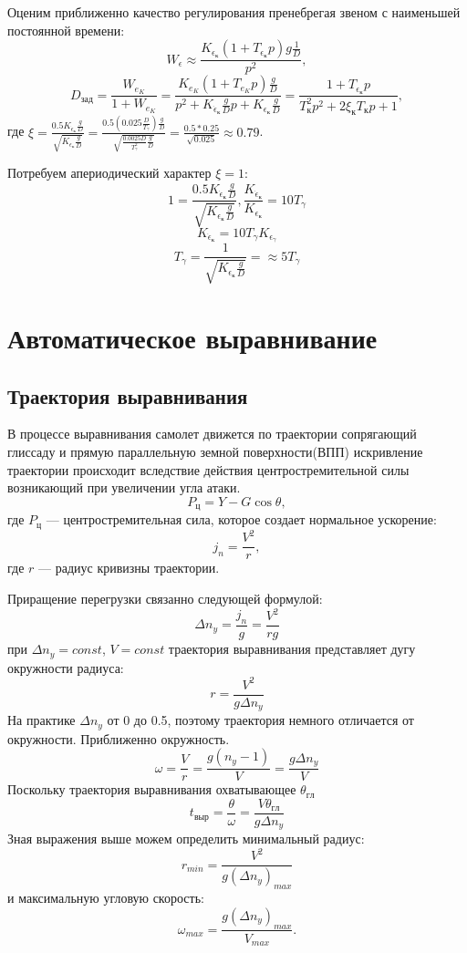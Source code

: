 \documentclass{article}
\begin{document}
Оценим приближенно качество регулирования пренебрегая звеном с наименьшей
постоянной времени:
\[
	W_{\epsilon} \approx \frac{K_{\epsilon_\text{к}}(1 + T_{\epsilon_\text{к}}
		p)g \frac{1}{D}}{p^2},
\]
\[
	D_\text{зад} = \frac{W_{e_K}}{1 + W_{e_K}} = \frac{K_{e_K} (1 + T_{e_K} p)
	\frac{g}{D}}{ p^2 + K_{\dot{\epsilon}_{\text{к}}} \frac{g}{D}p +
	K_{\epsilon_\text{к}} \frac{g}{D}} = \frac{1 + T_{\epsilon_\text{к}}p
	}{T_\text{к}^2 p^2 + 2 \xi_\text{к} T_\text{к} p + 1},
\]
где $\xi = \frac{0.5 K_{\dot{\epsilon}_{\text{к}}}
	\frac{g}{D}}{\sqrt{K_{\epsilon_\text{к}} \frac{g}{D}}} =\frac{0.5(0.025
		\frac{D}{T_\gamma}) \frac{g}{D}}{\sqrt{\frac{0.0025 D}{T^2_\gamma}
			\frac{g}{D}}} = \frac{0.5 * 0.25}{\sqrt{0.025}} \approx 0.79$.

Потребуем апериодический характер $\xi = 1$:
\[
	1 = \frac{0.5 K_{\dot{\epsilon}_{\text{к}}}
	\frac{g}{D}}{\sqrt{K_{{\epsilon}_{\text{к}}} \frac{g}{D}}},
	\frac{K_{\dot{\epsilon}_{\text{к}}}}{K_{{\epsilon}_{\text{к}}}} = 10
	T_\gamma
\]
\[
	K_{\dot{\epsilon}_{\text{к}}} = 10 T_{\gamma}  K_{\epsilon_\gamma}
\]
\[
	T_\gamma  = \frac{1}{\sqrt{K_{\epsilon_\text{к}}\frac{g}{D}}} = \approx 5
	T_\gamma
\]

\section{Автоматическое выравнивание}
\subsection{Траектория выравнивания }

В процессе выравнивания самолет движется по траектории сопрягающий глиссаду и
прямую параллельную земной поверхности(ВПП) искривление траектории происходит
вследствие действия центростремительной силы возникающий при увеличении угла
атаки.
\[
	P_{ц} = Y - G \cos{\theta},
\]
где $P_{ц}$ --- центростремительная сила, которое создает нормальное ускорение:
\[
	j_n = \frac{V^2}{r},
\]
где $r$ --- радиус кривизны траектории.

Приращение перегрузки связанно следующей формулой:
\[
	\Delta n_y = \frac{j_n}{g}= \frac{V^2}{rg}
\]
при $\Delta n_y = const$, $V = const$ траектория выравнивания представляет дугу
окружности радиуса:
\[
	r = \frac{V^2}{g \Delta n_y}
\]
На практике $\Delta n_y$ от 0 до 0.5, поэтому траектория немного отличается от
окружности. Приближенно окружность.
\[
	\omega = \frac{V}{r} = \frac{g(n_y - 1)}{V} = \frac{g \Delta n_y}{V}
\]
Поскольку траектория выравнивания охватывающее $\theta_{гл}$
\[
	t_{выр} = \frac{\theta}{\omega} = \frac{V \theta_{гл}}{g \Delta n_y}
\]
Зная выражения выше можем определить минимальный радиус:
\[
	r_{min} = \frac{V^2}{g(\Delta n_y)_{max}}
\]
и максимальную угловую скорость:
\[
	\omega_{max} = \frac{g(\Delta n_y)_{max}}{V_{max}}.
\]
\end{document}
